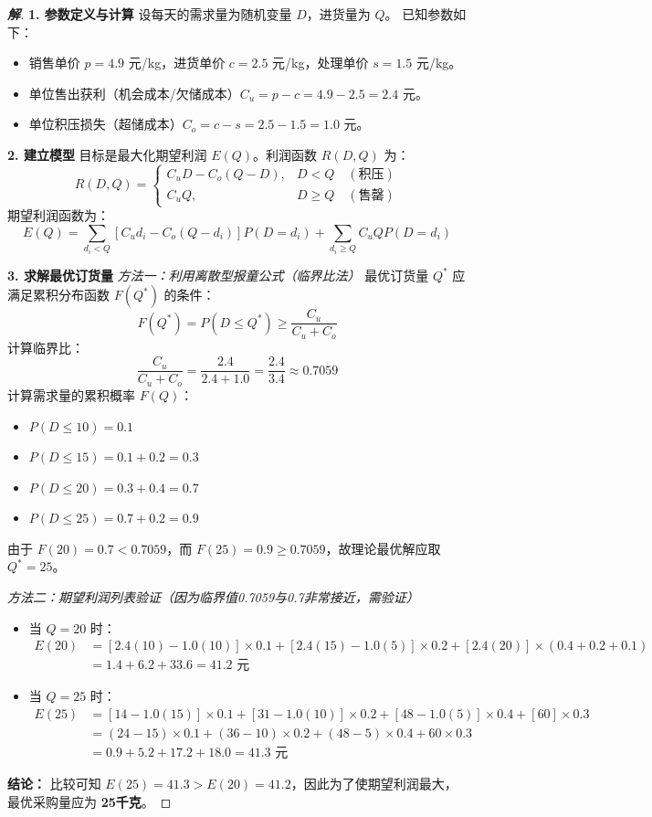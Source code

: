 \documentclass[a4paper,12pt]{ctexart} %
\newenvironment{solution}{\begin{proof}[\textbf{解}]}{\end{proof}}
\begin{document}
	\begin{solution}
		\textbf{1. 参数定义与计算}
		设每天的需求量为随机变量 $D$，进货量为 $Q$。
		已知参数如下：
		\begin{itemize}
			\item 销售单价 $p = 4.9$ 元/kg，进货单价 $c = 2.5$ 元/kg，处理单价 $s = 1.5$ 元/kg。
			\item 单位售出获利（机会成本/欠储成本）$C_u = p - c = 4.9 - 2.5 = 2.4$ 元。
			\item 单位积压损失（超储成本）$C_o = c - s = 2.5 - 1.5 = 1.0$ 元。
		\end{itemize}
		
		\textbf{2. 建立模型}
		目标是最大化期望利润 $E(Q)$。利润函数 $R(D, Q)$ 为：
		\[ R(D, Q) = \begin{cases} 
			C_u D - C_o (Q-D), & D < Q \quad (\text{积压}) \\
			C_u Q, & D \ge Q \quad (\text{售罄})
		\end{cases} \]
		期望利润函数为：
		\[ E(Q) = \sum_{d_i < Q} [C_u d_i - C_o(Q-d_i)] P(D=d_i) + \sum_{d_i \ge Q} C_u Q P(D=d_i) \]
		
		\textbf{3. 求解最优订货量}
		\textit{方法一：利用离散型报童公式（临界比法）}
		最优订货量 $Q^*$ 应满足累积分布函数 $F(Q^*)$ 的条件：
		\[ F(Q^*) = P(D \le Q^*) \ge \frac{C_u}{C_u + C_o} \]
		计算临界比：
		\[ \frac{C_u}{C_u + C_o} = \frac{2.4}{2.4 + 1.0} = \frac{2.4}{3.4} \approx 0.7059 \]
		计算需求量的累积概率 $F(Q)$：
		\begin{itemize}
			\item $P(D \le 10) = 0.1$
			\item $P(D \le 15) = 0.1 + 0.2 = 0.3$
			\item $P(D \le 20) = 0.3 + 0.4 = 0.7$
			\item $P(D \le 25) = 0.7 + 0.2 = 0.9$
		\end{itemize}
		由于 $F(20) = 0.7 < 0.7059$，而 $F(25) = 0.9 \ge 0.7059$，故理论最优解应取 $Q^* = 25$。
		
		\textit{方法二：期望利润列表验证（因为临界值0.7059与0.7非常接近，需验证）}
		\begin{itemize}
			\item 当 $Q=20$ 时：
			\begin{align*}
				E(20) &= [2.4(10) - 1.0(10)] \times 0.1 + [2.4(15) - 1.0(5)] \times 0.2 + [2.4(20)] \times (0.4+0.2+0.1) \\
				&= 1.4 + 6.2 + 33.6 = 41.2 \text{ 元}
			\end{align*}
			\item 当 $Q=25$ 时：
			\begin{align*}
				E(25) &= [14 - 1.0(15)] \times 0.1 + [31 - 1.0(10)] \times 0.2 + [48 - 1.0(5)] \times 0.4 + [60] \times 0.3 \\
				&= (24-15) \times 0.1 + (36-10) \times 0.2 + (48-5) \times 0.4 + 60 \times 0.3 \\
				&= 0.9 + 5.2 + 17.2 + 18.0 = 41.3 \text{ 元}
			\end{align*}
		\end{itemize}
		
		\textbf{结论：} 比较可知 $E(25) = 41.3 > E(20) = 41.2$，因此为了使期望利润最大，最优采购量应为 \textbf{25千克}。
	\end{solution}
	
\end{document}
